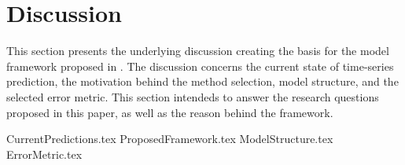 
\section{Discussion}
\label{section:Discussion:Discussion}



This section presents the underlying discussion creating the basis for the model framework proposed in .
The discussion concerns the current state of time-series prediction, the motivation behind the method selection, model structure, and the selected error metric.
This section intendeds to answer the research questions proposed in this paper,
as well as the reason behind the framework.


{CurrentPredictions.tex}
{ProposedFramework.tex}
{ModelStructure.tex}
{ErrorMetric.tex}



\iffalse
  In the discussion it is important to include a discussion of not just the merits of the work conducted but also the limitations.
\fi
